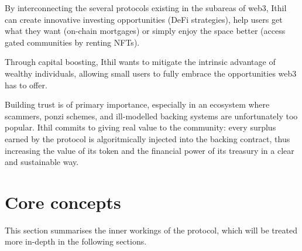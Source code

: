 \documentclass[a4paper,10 pt]{article}
\theoremstyle{definition}
\begin{document}
By interconnecting the several protocols existing in the subareas of web3, Ithil can create innovative investing opportunities (DeFi strategies), help users get what they want (on-chain mortgages) or simply enjoy the space better (access gated communities by renting NFTs).

Through capital boosting, Ithil wants to mitigate the intrinsic advantage of wealthy individuals, allowing small users to fully embrace the opportunities web3 has to offer.

Building trust is of primary importance, especially in an ecosystem where scammers, ponzi schemes, and ill-modelled backing systems are unfortunately too popular. Ithil commits to giving real value to the community: every surplus earned by the protocol is algoritmically injected into the backing contract, thus increasing the value of its token and the financial power of its treasury in a clear and sustainable way.

\newpage
\section{Core concepts}\label{coreSec}
This section summarises the inner workings of the protocol, which will be treated more in-depth in the following sections. 
\end{document}
